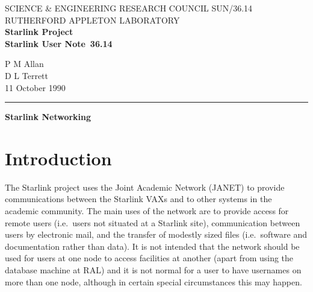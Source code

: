 \pagestyle{myheadings}

\newcommand{\stardoccategory}  {Starlink User Note}
\newcommand{\stardocinitials}  {SUN}
\newcommand{\stardocnumber}    {36.14}
\newcommand{\stardocauthors}   {P M Allan\\D L Terrett}
\newcommand{\stardocdate}      {11 October 1990}
\newcommand{\stardoctitle}     {Starlink Networking}

\newcommand{\stardocname}{\stardocinitials /\stardocnumber}
\markright{\stardocname}
\setlength{\textwidth}{160mm}
\setlength{\textheight}{240mm}
\setlength{\topmargin}{-5mm}
\setlength{\oddsidemargin}{0mm}
\setlength{\evensidemargin}{0mm}
\setlength{\parindent}{0mm}
\setlength{\parskip}{\medskipamount}
\setlength{\unitlength}{1mm}


\thispagestyle{empty}
SCIENCE \& ENGINEERING RESEARCH COUNCIL \hfill \stardocname\\
RUTHERFORD APPLETON LABORATORY\\
{\large\bf Starlink Project\\}
{\large\bf \stardoccategory\ \stardocnumber}
\begin{flushright}
\stardocauthors\\
\stardocdate
\end{flushright}
\vspace{-4mm}
\rule{\textwidth}{0.5mm}
\vspace{5mm}
\begin{center}
{\Large\bf \stardoctitle}
\end{center}
\vspace{5mm}

\section{Introduction}

The Starlink project uses the Joint Academic Network (JANET) to provide
communications between the Starlink VAXs and to other systems in the academic
community.
The main uses of the network are to provide access for remote users (i.e.\ users
not situated at a Starlink site), communication between users by electronic
mail, and the transfer of modestly sized files (i.e.\ software and documentation
rather than data).
It is not intended that the network should be used for users at one node to
access facilities at another
(apart from using the database machine at RAL)
and it is not normal for a user to have usernames
on more than one node, although in certain special circumstances this may
happen.

